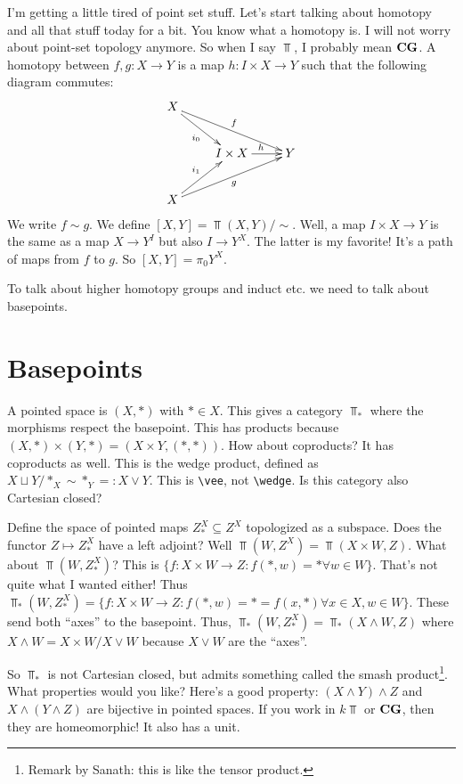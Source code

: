 I'm getting a little tired of point set stuff. Let's start talking about homotopy and all that stuff today for a bit. You know what a homotopy is. I will not worry about point-set topology anymore. So when I say $\Top$, I probably mean $\mathbf{CG}$. A homotopy between $f,g:X\to Y$ is a map $h:I\times X\to Y$ such that the following diagram commutes:
\begin{equation*}
    \xymatrix{
	X\ar[dr]_{i_0}\ar[drr]^f & &\\
	& I\times X\ar[r]^h & Y\\
	X\ar[ur]^{i_1}\ar[urr]_g & &
    }
\end{equation*}
We write $f\sim g$. We define $[X,Y]=\Top(X,Y)/\sim$. Well, a map $I\times X\to Y$ is the same as a map $X\to Y^I$ but also $I\to Y^X$. The latter is my favorite! It's a path of maps from $f$ to $g$. So $[X,Y]=\pi_0Y^X$.

To talk about higher homotopy groups and induct etc. we need to talk about basepoints.
\section{Basepoints}
A pointed space is $(X,\ast)$ with $\ast\in X$. This gives a category $\Top_\ast$ where the morphisms respect the basepoint. This has products because $(X,\ast)\times (Y,\ast)=(X\times Y,(\ast,\ast))$. How about coproducts? It has coproducts as well. This is the wedge product, defined as $X\sqcup Y/\ast_X\sim \ast_Y=:X\vee Y$. This is \verb|\vee|, not \verb|\wedge|. Is this category also Cartesian closed?

Define the space of pointed maps $Z^X_\ast\subseteq Z^X$ topologized as a subspace. Does the functor $Z\mapsto Z^X_\ast$ have a left adjoint? Well $\Top(W,Z^X)=\Top(X\times W,Z)$. What about $\Top(W,Z^X_\ast)$? This is $\{f:X\times W\to Z:f(\ast,w)=\ast\forall w\in W\}$. That's not quite what I wanted either! Thus $\Top_\ast(W,Z^X_\ast)=\{f:X\times W\to Z:f(\ast,w)=\ast=f(x,\ast)\forall x\in X, w\in W\}$. These send both ``axes'' to the basepoint. Thus, $\Top_\ast(W,Z^X_\ast)=\Top_\ast(X\wedge W,Z)$ where $X\wedge W=X\times W/X\vee W$ because $X\vee W$ are the ``axes''.

So $\Top_\ast$ is not Cartesian closed, but admits something called the smash product\footnote{Remark by Sanath: this is like the tensor product.}. What properties would you like? Here's a good property: $(X\wedge Y)\wedge Z$ and $X\wedge(Y\wedge Z)$ are bijective in pointed spaces. If you work in $k\Top$ or $\mathbf{CG}$, then they are homeomorphic! It also has a unit.

